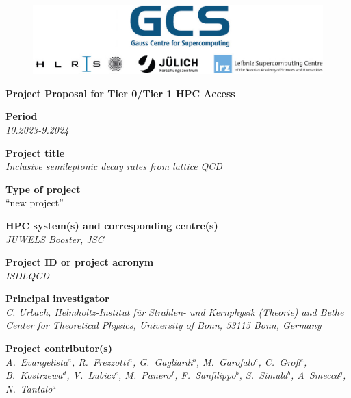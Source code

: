\documentclass [a4paper, 11pt]{article}
\begin{document}
 
\begin{figure}[H]
\begin{center}
  \includegraphics[scale=0.45]{Figures/GCS-hlrs-fzj-lrz.jpg}\\
\end{center}
\end{figure}

\begin{center}
{\LARGE \bf Project Proposal for Tier 0/Tier 1 HPC Access} \\

\bigskip
\bigskip
\bigskip
\end{center}
\textbf{Period}\\
\phantom{MM}\textit{10.2023-9.2024}

\bigskip
\textbf{Project title}\\
\phantom{MM}\textit{Inclusive semileptonic decay rates from lattice QCD}

\bigskip
\textbf{Type of project}\\
\phantom{MM} ``new project''

\bigskip
\textbf{HPC system(s) and corresponding centre(s)}\\
\phantom{MM} \textit{JUWELS Booster, JSC}

\bigskip
\textbf{Project ID or project acronym}\\
\phantom{MM} \textit{ISDLQCD}%

\bigskip
\textbf{Principal investigator}\\
\phantom{MM} \textit{C. Urbach, Helmholtz-Institut für Strahlen- und Kernphysik (Theorie) and
	Bethe Center for Theoretical Physics, University of Bonn, 53115 Bonn, Germany}

\bigskip
\textbf{Project contributor(s)}\\
\phantom{MM} \textit{ 
 A.~Evangelista$^a$,
 R.~Frezzotti$^a$,
 G.~Gagliardi$^b$,
 M.~Garofalo$^c$,
 C.~Groß$^c$,
 B.~Kostrzewa$^d$,
 V.~Lubicz$^e$,
 M.~Panero$^f$,
 F.~Sanfilippo$^b$,
 S.~Simula$^b$,
 A~Smecca$^g$,
 N.~Tantalo$^a$
}\\ 
\end{document}
